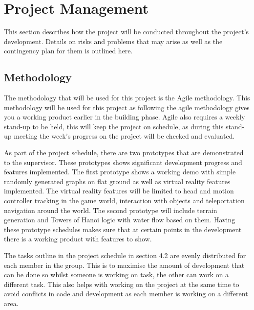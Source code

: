 \chapter{Project Management}
\label{chapter4}

This section describes how the project will be conducted throughout the project's development. Details on risks and problems that may arise as well as the contingency plan for them is outlined here.

\section{Methodology}
The methodology that will be used for this project is the Agile methodology. This methodology will be used for this project as following the agile methodology gives you a working product earlier in the building phase. Agile also requires a weekly stand-up to be held, this will keep the project on schedule, as during this stand-up meeting the week's progress on the project will be checked and evaluated.  
\newline
\par
As part of the project schedule, there are two prototypes that are demonstrated to the supervisor. These prototypes shows significant development progress and features implemented. The first prototype shows a working demo with simple randomly generated graphs on flat ground as well as virtual reality features implemented. The virtual reality features will be limited to head and motion controller tracking in the game world, interaction with objects and teleportation navigation around the world. The second prototype will include terrain generation and Towers of Hanoi logic with water flow based on them. Having these prototype schedules makes sure that at certain points in the development there is a working product with features to show.
\newline
\par
The tasks outline in the project schedule in section 4.2 are evenly distributed for each member in the group. This is to maximise the amount of development that can be done so whilst someone is working on task, the other can work on a different task. This also helps with working on the project at the same time to avoid conflicts in code and development as each member is working on a different area.
\clearpage
